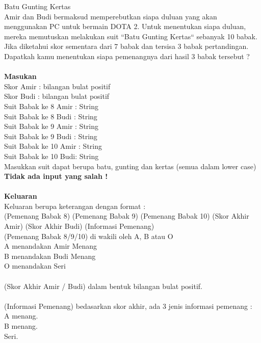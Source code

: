 \newpage
\begin{permasalahan}{Batu Gunting Kertas}\\
\label{prob:kaibaibok}
Amir dan Budi bermaksud memperebutkan siapa duluan yang akan menggunakan PC untuk bermain DOTA 2. Untuk menentukan siapa duluan, mereka memutuskan melakukan suit ``Batu Gunting Kertas`` sebanyak 10 babak. Jika diketahui skor sementara dari 7 babak dan tersisa 3 babak pertandingan. Dapatkah kamu menentukan siapa pemenangnya dari hasil 3 babak tersebut ?  \\\\
 
	\textbf{Masukan}\\
	Skor Amir : bilangan bulat positif\\
	Skor Budi : bilangan bulat positif\\
	Suit Babak ke 8 Amir : String\\
	Suit Babak ke 8 Budi : String\\
	Suit Babak ke 9 Amir : String\\
	Suit Babak ke 9 Budi : String\\
	Suit Babak ke 10 Amir : String\\
	Suit Babak ke 10 Budi: String	\\
	Masukkan suit dapat berupa batu, gunting dan kertas (semua dalam lower case)\\
	\textbf{Tidak ada input yang salah !}\\\\
	\textbf{Keluaran}\\
	Keluaran berupa keterangan dengan format :\\
	(Pemenang Babak 8) (Pemenang Babak 9) (Pemenang Babak 10) (Skor Akhir Amir) (Skor Akhir Budi) (Informasi Pemenang)\\
	
	(Pemenang Babak 8/9/10) di wakili oleh A, B atau O \\
	A menandakan Amir Menang\\
	B menandakan Budi Menang\\
	O menandakan Seri\\\\

	(Skor Akhir Amir / Budi) dalam bentuk bilangan bulat positif.\\\\
	
	(Informasi Pemenang) bedasarkan skor akhir,  ada 3 jenis informasi pemenang : \\
	A menang.\\
	B menang.\\
	Seri.\\\\
	

\end{permasalahan}
